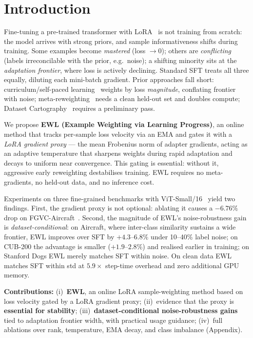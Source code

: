 \section{Introduction}
\label{sec:intro}

Fine-tuning a pre-trained transformer with LoRA~\cite{hu2022lora} is not
training from scratch: the model arrives with strong priors, and sample
informativeness shifts during training.
Some examples become \emph{mastered} (loss $\to 0$); others are
\emph{conflicting} (labels irreconcilable with the prior, e.g.\ noise); a
shifting minority sits at the \emph{adaptation frontier}, where loss is
actively declining.
Standard SFT treats all three equally, diluting each mini-batch gradient.
Prior approaches fall short: curriculum/self-paced
learning~\cite{bengio2009curriculum,kumar2010self} weights by loss
\emph{magnitude}, conflating frontier with noise; meta-reweighting~\cite{ren2018learning,shu2019meta}
needs a clean held-out set and doubles compute; Dataset
Cartography~\cite{swayamdipta2020dataset} requires a preliminary pass.

We propose \textbf{EWL (Example Weighting via Learning Progress)}, an online
method that tracks per-sample loss velocity via an EMA and gates it with a
\emph{LoRA gradient proxy} --- the mean Frobenius norm of adapter gradients,
acting as an adaptive temperature that sharpens weights during rapid
adaptation and decays to uniform near convergence.
This gating is essential: without it, aggressive early reweighting
destabilises training.
EWL requires no meta-gradients, no held-out data, and no inference cost.

Experiments on three fine-grained benchmarks with ViT-Small/16~\cite{dosovitskiy2021vit} yield two
findings.
First, the gradient proxy is not optional: ablating it causes a $-6.76\%$
drop on FGVC-Aircraft~\cite{maji2013aircraft}.
Second, the magnitude of EWL's noise-robustness gain is
\emph{dataset-conditional}: on Aircraft, where inter-class similarity
sustains a wide frontier, EWL improves over SFT by $+4.3$--$6.8\%$ under
10--40\% label noise; on CUB-200 \cite{wah2011cub} the advantage is smaller ($+1.9$--$2.8\%$)
and realised earlier in training; on Stanford Dogs \cite{khosla2011dogs} EWL merely matches SFT
within noise.
On clean data EWL matches SFT within std at $5.9\times$ step-time overhead
and zero additional GPU memory.

\noindent\textbf{Contributions:} (i)~\textbf{EWL}, an online LoRA
sample-weighting method based on loss velocity gated by a LoRA gradient
proxy; (ii)~evidence that the proxy is \textbf{essential for stability};
(iii)~\textbf{dataset-conditional noise-robustness gains} tied to
adaptation frontier width, with practical usage guidance; (iv)~full ablations over
rank, temperature, EMA decay, and class imbalance (Appendix).
